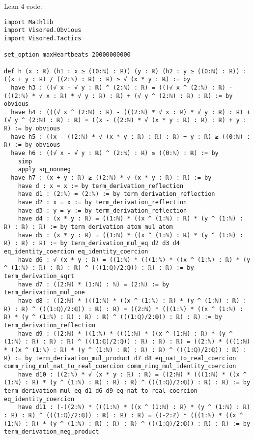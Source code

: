 \documentclass{article}
\begin{document}
Lean 4 code:
\begin{tcolorbox}[colback=white!10, width=\linewidth]
\begin{lstlisting}[language=Lean4]
import Mathlib
import Visored.Obvious
import Visored.Tactics

set_option maxHeartbeats 20000000000

def h (x : ℝ) (h1 : x ≥ ((0:ℕ) : ℝ)) (y : ℝ) (h2 : y ≥ ((0:ℕ) : ℝ)) : ((x + y : ℝ) / ((2:ℕ) : ℝ) : ℝ) ≥ √ (x * y : ℝ) := by
  have h3 : ((√ x - √ y : ℝ) ^ (2:ℕ) : ℝ) = (((√ x ^ (2:ℕ) : ℝ) - (((2:ℕ) * √ x : ℝ) * √ y : ℝ) : ℝ) + (√ y ^ (2:ℕ) : ℝ) : ℝ) := by obvious
  have h4 : (((√ x ^ (2:ℕ) : ℝ) - (((2:ℕ) * √ x : ℝ) * √ y : ℝ) : ℝ) + (√ y ^ (2:ℕ) : ℝ) : ℝ) = ((x - ((2:ℕ) * √ (x * y : ℝ) : ℝ) : ℝ) + y : ℝ) := by obvious
  have h5 : ((x - ((2:ℕ) * √ (x * y : ℝ) : ℝ) : ℝ) + y : ℝ) ≥ ((0:ℕ) : ℝ) := by obvious
  have h6 : ((√ x - √ y : ℝ) ^ (2:ℕ) : ℝ) ≥ ((0:ℕ) : ℝ) := by
    simp
    apply sq_nonneg
  have h7 : (x + y : ℝ) ≥ ((2:ℕ) * √ (x * y : ℝ) : ℝ) := by
    have d : x = x := by term_derivation_reflection
    have d1 : (2:ℕ) = (2:ℕ) := by term_derivation_reflection
    have d2 : x = x := by term_derivation_reflection
    have d3 : y = y := by term_derivation_reflection
    have d4 : (x * y : ℝ) = ((1:ℕ) * ((x ^ (1:ℕ) : ℝ) * (y ^ (1:ℕ) : ℝ) : ℝ) : ℝ) := by term_derivation_atom_mul_atom
    have d5 : (x * y : ℝ) = ((1:ℕ) * ((x ^ (1:ℕ) : ℝ) * (y ^ (1:ℕ) : ℝ) : ℝ) : ℝ) := by term_derivation_mul_eq d2 d3 d4 eq_identity_coercion eq_identity_coercion
    have d6 : √ (x * y : ℝ) = ((1:ℕ) * (((1:ℕ) * ((x ^ (1:ℕ) : ℝ) * (y ^ (1:ℕ) : ℝ) : ℝ) : ℝ) ^ (((1:ℚ)/2:ℚ)) : ℝ) : ℝ) := by term_derivation_sqrt
    have d7 : ((2:ℕ) * (1:ℕ) : ℕ) = (2:ℕ) := by term_derivation_mul_one
    have d8 : ((2:ℕ) * (((1:ℕ) * ((x ^ (1:ℕ) : ℝ) * (y ^ (1:ℕ) : ℝ) : ℝ) : ℝ) ^ (((1:ℚ)/2:ℚ)) : ℝ) : ℝ) = ((2:ℕ) * (((1:ℕ) * ((x ^ (1:ℕ) : ℝ) * (y ^ (1:ℕ) : ℝ) : ℝ) : ℝ) ^ (((1:ℚ)/2:ℚ)) : ℝ) : ℝ) := by term_derivation_reflection
    have d9 : ((2:ℕ) * ((1:ℕ) * (((1:ℕ) * ((x ^ (1:ℕ) : ℝ) * (y ^ (1:ℕ) : ℝ) : ℝ) : ℝ) ^ (((1:ℚ)/2:ℚ)) : ℝ) : ℝ) : ℝ) = ((2:ℕ) * (((1:ℕ) * ((x ^ (1:ℕ) : ℝ) * (y ^ (1:ℕ) : ℝ) : ℝ) : ℝ) ^ (((1:ℚ)/2:ℚ)) : ℝ) : ℝ) := by term_derivation_mul_product d7 d8 eq_nat_to_real_coercion comm_ring_mul_nat_to_real_coercion comm_ring_mul_identity_coercion
    have d10 : ((2:ℕ) * √ (x * y : ℝ) : ℝ) = ((2:ℕ) * (((1:ℕ) * ((x ^ (1:ℕ) : ℝ) * (y ^ (1:ℕ) : ℝ) : ℝ) : ℝ) ^ (((1:ℚ)/2:ℚ)) : ℝ) : ℝ) := by term_derivation_mul_eq d1 d6 d9 eq_nat_to_real_coercion eq_identity_coercion
    have d11 : (-((2:ℕ) * (((1:ℕ) * ((x ^ (1:ℕ) : ℝ) * (y ^ (1:ℕ) : ℝ) : ℝ) : ℝ) ^ (((1:ℚ)/2:ℚ)) : ℝ) : ℝ) : ℝ) = ((-2:ℤ) * (((1:ℕ) * ((x ^ (1:ℕ) : ℝ) * (y ^ (1:ℕ) : ℝ) : ℝ) : ℝ) ^ (((1:ℚ)/2:ℚ)) : ℝ) : ℝ) := by term_derivation_neg_product

\end{lstlisting}
\end{tcolorbox}
\end{document}
